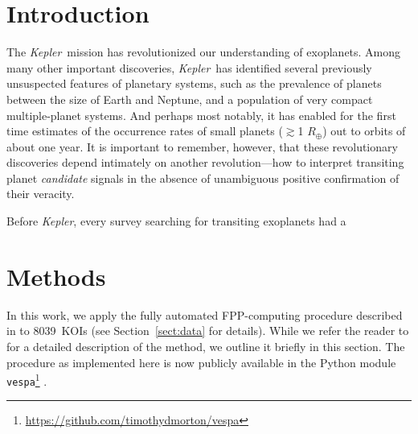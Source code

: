 \documentclass{emulateapj}
\newcommand{\sectionname}{Section}
\newcommand{\Sect}[1]{\sectionname~\ref{sect:#1}}
\newcommand{\sect}[1]{\Sect{#1}}
\newcommand{\sectlabel}[1]{\label{sect:#1}}
\newcommand{\ncalc}{8039}
\newcommand{\kepler}{\textit{Kepler}}
\newcommand{\vespa}{\texttt{vespa}}
\begin{document}

\keywords{}


\section{Introduction}

The \kepler\ mission has revolutionized our understanding of
exoplanets.  Among many other important discoveries, \kepler\ has
identified several previously unsuspected features of planetary
systems, such as the prevalence of planets between the size of Earth
and Neptune, and a population of very compact multiple-planet
systems. And perhaps most notably, it has enabled for the first time
estimates of the occurrence rates of small planets ($\gtrsim$1
$R_\oplus$) out to orbits of about one year.  It is important to
remember, however, that these revolutionary discoveries depend
intimately on another revolution---how to interpret transiting planet
\textit{candidate} signals in the absence of unambiguous positive
confirmation of their veracity.

Before \kepler, every survey searching for transiting exoplanets had a 




\section{Methods}
\sectlabel{methods}

In this work, we apply the fully automated FPP-computing
procedure described in \citet[][hereafter
  ]{Morton:2012} to \ncalc\ KOIs (see
\sect{data} for details).  While we refer the reader to
 for a detailed description of the method, we
outline it briefly in this section.  The procedure as implemented here
is now publicly available in the Python module
\vespa\footnote{\url{https://github.com/timothydmorton/vespa}}
\citep{vespa}.
\end{document}
